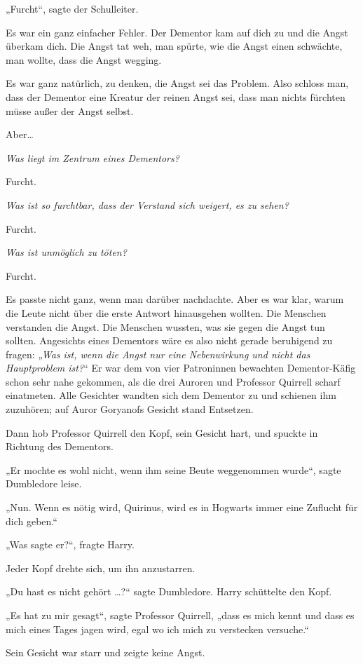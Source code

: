 {„Furcht“, sagte der Schulleiter.

Es war ein ganz einfacher Fehler. Der Dementor kam auf dich zu und die Angst überkam dich. Die Angst tat weh, man spürte, wie die Angst einen schwächte, man wollte, dass die Angst wegging.

Es war ganz natürlich, zu denken, die Angst sei das Problem. Also schloss man, dass der Dementor eine Kreatur der reinen Angst sei, dass man nichts fürchten müsse außer der Angst selbst.

Aber…

\emph{Was liegt im Zentrum eines Dementors?}

Furcht.

\emph{Was ist so furchtbar, dass der Verstand sich weigert, es zu sehen?}

Furcht.

\emph{Was ist unmöglich zu töten?}

Furcht.

Es passte nicht ganz, wenn man darüber nachdachte. Aber es war klar, warum die Leute nicht über die erste Antwort hinausgehen wollten. Die Menschen verstanden die Angst. Die Menschen wussten, was sie gegen die Angst tun sollten. Angesichts eines Dementors wäre es also nicht gerade beruhigend zu fragen: \emph{„Was ist, wenn die Angst nur eine Nebenwirkung und nicht das} \emph{Hauptproblem ist?}“ Er war dem von vier Patroninnen bewachten Dementor-Käfig schon sehr nahe gekommen, als die drei Auroren und Professor Quirrell scharf einatmeten. Alle Gesichter wandten sich dem Dementor zu und schienen ihm zuzuhören; auf Auror Goryanofs Gesicht stand Entsetzen.

Dann hob Professor Quirrell den Kopf, sein Gesicht hart, und spuckte in Richtung des Dementors.

„Er mochte es wohl nicht, wenn ihm seine Beute weggenommen wurde“, sagte Dumbledore leise.

„Nun. Wenn es nötig wird, Quirinus, wird es in Hogwarts immer eine Zuflucht für dich geben.“

„Was sagte er?“, fragte Harry.

Jeder Kopf drehte sich, um ihn anzustarren.

„Du hast es nicht gehört …?“ sagte Dumbledore. Harry schüttelte den Kopf.

„Es hat zu mir gesagt“, sagte Professor Quirrell, „dass es mich kennt und dass es mich eines Tages jagen wird, egal wo ich mich zu verstecken versuche.“

Sein Gesicht war starr und zeigte keine Angst.

}
